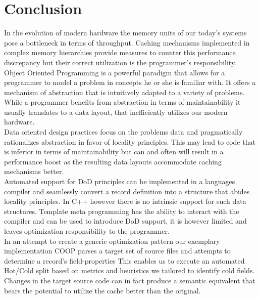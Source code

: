 

\section{Conclusion}\label{conclusion}
In the evolution of modern hardware the memory units of our today's systems pose a bottleneck in terms of throughput. Caching mechanisms implemented in complex memory hierarchies provide measures to counter this performance discrepancy but their correct utilization is the programmer's responsibility.\\
Object Oriented Programming is a powerful paradigm that allows for a programmer to model a problem in concepts he or she is familiar with. It offers a mechanism of abstraction that is intuitively adapted to a variety of problems. While a programmer benefits from abstraction in terms of maintainability it usually translates to a data layout, that inefficiently utilizes our modern hardware.\\
Data oriented design practices focus on the problems data and pragmatically rationalizes abstraction in favor of locality principles. This may lead to code that is inferior in terms of maintainability but can and often will result in a performance boost as the resulting data layouts accommodate caching mechanisms better.\\
Automated support for DoD principles can be implemented in a languages compiler and seamlessly convert a record definition into a structure that abides locality principles. In C++ however there is no intrinsic support for such data structures. Template meta programming has the ability to interact with the compiler and can be used to introduce DoD support, it is however limited and leaves optimization responsibility to the programmer.\\
In an attempt to create a generic optimization pattern our exemplary implementation COOP parses a target set of source files and attempts to determine a record's field-properties This enables us to execute an automated Hot/Cold split based on metrics and heuristics we tailored to identify cold fields. Changes in the target source code can in fact produce a semantic equivalent that bears the potential to utilize the cache better than the original.\\\\
